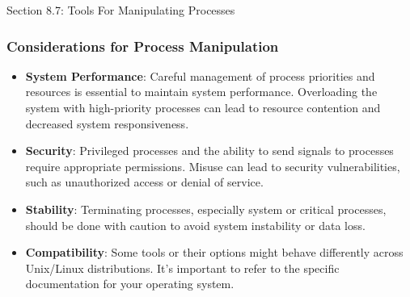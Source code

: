 \begin{notes}{Section 8.7: Tools For Manipulating Processes}
    \subsubsection*{Considerations for Process Manipulation}
    
    \begin{itemize}
        \item \textbf{System Performance}: Careful management of process priorities and resources is essential to maintain system performance. Overloading the system with high-priority processes can 
        lead to resource contention and decreased system responsiveness.
        \item \textbf{Security}: Privileged processes and the ability to send signals to processes require appropriate permissions. Misuse can lead to security vulnerabilities, such as unauthorized 
        access or denial of service.
        \item \textbf{Stability}: Terminating processes, especially system or critical processes, should be done with caution to avoid system instability or data loss.
        \item \textbf{Compatibility}: Some tools or their options might behave differently across Unix/Linux distributions. It's important to refer to the specific documentation for your operating system.
    \end{itemize}    
\end{notes}